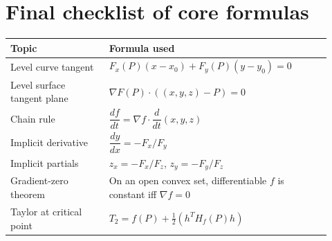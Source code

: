 \documentclass[11pt]{article}
\newcommand{\grad}{\nabla}
\begin{document}
\section*{Final checklist of core formulas}
\begin{longtable}{p{0.29\linewidth}p{0.63\linewidth}}
\toprule
Topic & Formula used \\
\midrule
Level curve tangent & $F_x(P)(x-x_0)+F_y(P)(y-y_0)=0$ \\
Level surface tangent plane & $\grad F(P)\cdot((x,y,z)-P)=0$ \\
Chain rule & $\dfrac{df}{dt}=\grad f\cdot \dfrac{d}{dt}(x,y,z)$ \\
Implicit derivative & $\dfrac{dy}{dx}=-F_x/F_y$ \\
Implicit partials & $z_x=-F_x/F_z$, $z_y=-F_y/F_z$ \\
Gradient-zero theorem & On an open convex set, differentiable $f$ is constant iff $\grad f=0$ \\
Taylor at critical point & $T_2=f(P)+\frac12(h^TH_f(P)h)$ \\
\bottomrule
\end{longtable}
\end{document}

